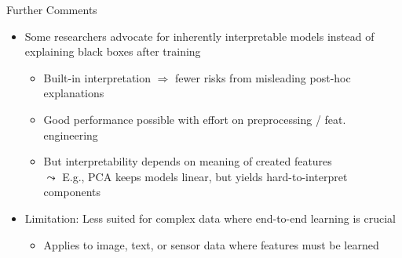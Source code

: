 \documentclass[11pt,compress,t,notes=noshow, aspectratio=169, xcolor=table]{beamer}
\begin{document}
\begin{frame}{Further Comments}

    \begin{itemize}
        \item<1-> Some researchers advocate for inherently interpretable models instead of explaining black boxes after training 
        \begin{itemize}
        \item Built-in interpretation $\Rightarrow$ fewer risks from misleading post-hoc explanations
        
            \item  Good performance possible with effort on preprocessing / feat. engineering
    \item But interpretability depends on meaning of created features\\
    $\leadsto$ E.g., PCA keeps models linear, but yields hard-to-interpret components
        \end{itemize}
      \item<2-> Limitation: Less suited for complex data where end-to-end learning is crucial
\begin{itemize}
    \item Applies to image, text, or sensor data where features must be learned %

\end{itemize}
\end{itemize}
\end{frame}
\end{document}
